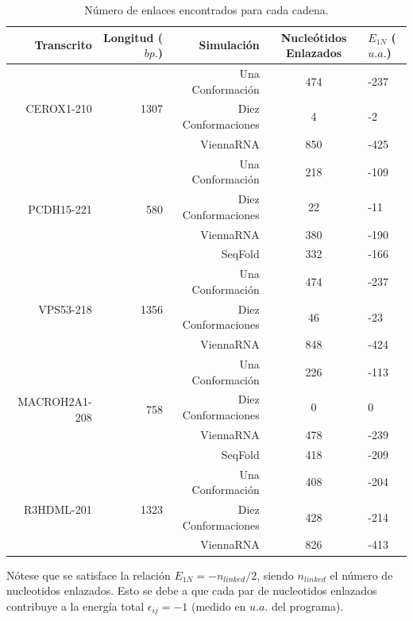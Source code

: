 \documentclass[a4paper,11pt,titlepage]{article}
\theoremstyle{definition}
\begin{document}
\begin{table}[H]
	\centering
    \begin{adjustbox}{width=0.75\textwidth}
	\begin{tabular}{rrrcl}
	    \toprule
        Transcrito & Longitud ($bp.$) & Simulación & Nucleótidos Enlazados & $E_{1N}$ ($u.a.$) \\
		\midrule
        \multirow{3}{*}{CEROX1-210} & \multirow{3}{*}{1307} & Una Conformación & 474 & -237 \\
        &  & Diez Conformaciones & 4 & -2 \\
        &  & ViennaRNA & 850 & -425 \\
        \midrule
        \multirow{4}{*}{PCDH15-221} & \multirow{4}{*}{580} & Una Conformación & 218 & -109 \\
        &  & Diez Conformaciones & 22 & -11 \\
        &  & ViennaRNA & 380 & -190 \\
        &  & SeqFold & 332 & -166 \\
        \midrule
        \multirow{3}{*}{VPS53-218} & \multirow{3}{*}{1356} & Una Conformación & 474 & -237 \\
        &  & Diez Conformaciones & 46 & -23 \\
        &  & ViennaRNA & 848 & -424 \\
        \midrule
        \multirow{4}{*}{MACROH2A1-208} & \multirow{4}{*}{758} & Una Conformación & 226 & -113 \\
        &  & Diez Conformaciones & 0 & 0 \\
        &  & ViennaRNA & 478 & -239 \\
        &  & SeqFold & 418 & -209 \\
        \midrule
        \multirow{3}{*}{R3HDML-201} & \multirow{3}{*}{1323} & Una Conformación & 408 & -204 \\
        &  & Diez Conformaciones & 428 & -214 \\
        &  & ViennaRNA & 826 & -413 \\
		\bottomrule
	\end{tabular}
    \end{adjustbox}
	\caption{Número de enlaces encontrados para cada cadena.}
    \label{tab:linking}
\end{table}

Nótese que se satisface la relación $E_{1N} = - n_{linked} / 2$, siendo $n_{linked}$ el número de nucleotidos enlazados. Esto se debe a que cada par de nucleotidos enlazados contribuye a la energía total $\epsilon_{ij} = -1$ (medido en $u.a.$ del programa). 
\end{document}
